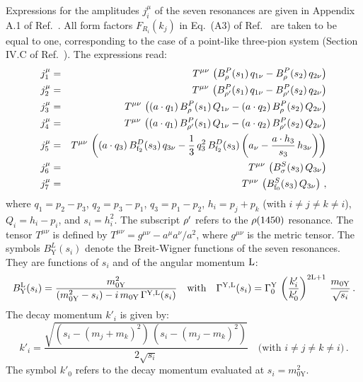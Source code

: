 Expressions for the amplitudes $j_{i}^{\mu}$ of the seven resonances are given in Appendix A.1 of Ref.~\cite{CLEO:1999rzk}.
All form factors $F_{R_{i}}(k_{j})$ in Eq.~(A3) of Ref.~\cite{CLEO:1999rzk} are taken to be equal to one,
corresponding to the case of a point-like three-pion system (\cf Section IV.C of Ref.~\cite{CLEO:1999rzk}).
The expressions read:
\begin{eqnarray}
j_{1}^{\mu} & = & T^{\mu\nu} \, \left( B_{\rho}^{P}(s_{1}) \, q_{1\nu} - B_{\rho}^{P}(s_{2}) \, q_{2\nu} \right) \nonumber \\
j_{2}^{\mu} & = & T^{\mu\nu} \, \left( B_{\rho'}^{P}(s_{1}) \, q_{1\nu} - B_{\rho'}^{P}(s_{2}) \, q_{2\nu} \right) \nonumber \\
j_{3}^{\mu} & = & T^{\mu\nu} \, \left( (a \cdot q_{1}) \, B_{\rho}^{P}(s_{1}) \, Q_{1\nu} - (a \cdot q_{2}) \, B_{\rho}^{P}(s_{2}) \, Q_{2\nu} \right) \nonumber \\
j_{4}^{\mu} & = & T^{\mu\nu} \, \left( (a \cdot q_{1}) \, B_{\rho'}^{P}(s_{1}) \, Q_{1\nu} - (a \cdot q_{2}) \, B_{\rho'}^{P}(s_{2}) \, Q_{2\nu} \right) \nonumber \\
j_{5}^{\mu} & = & T^{\mu\nu} \, \left( (a \cdot q_{3}) \, B_{\textrm{f}_{2}}^{D}(s_{3}) \, q_{3\nu} - \frac{1}{3} \, q_{3}^{2} \, B_{\textrm{f}_{2}}^{D}(s_{3}) \left( a_{\nu} - \frac{a \cdot h_{3}}{s_{3}} \, h_{3\nu} \right) \right) \nonumber \\
j_{6}^{\mu} & = & T^{\mu\nu} \, \left( B_{\sigma}^{S}(s_{3}) \, Q_{3\nu} \right) \nonumber \\
j_{7}^{\mu} & = & T^{\mu\nu} \, \left( B_{\textrm{f}_{0}}^{S}(s_{3}) \, Q_{3\nu} \right) \, ,
\end{eqnarray}
where 
$q_{1} = p_{2} - p_{3}$, $q_{2} = p_{3} - p_{1}$, $q_{3} = p_{1} - p_{2}$,
$h_{i} = p_{j} + p_{k}$ (with $i \not= j \not= k \not= i$),
$Q_{i} = h_{i} - p_{i}$, and $s_{i} = h_{i}^{2}$. 
The subscript $\rho'$ refers to the $\rho\textrm{(1450)}$ resonance.
The tensor $T^{\mu\nu}$ is defined by $T^{\mu\nu} = g^{\mu\nu} - a^{\mu}a^{\nu}/a^{2}$, where $g^{\mu\nu}$ is the metric tensor.
The symbols $B_{\textrm{Y}}^{L}(s_{i})$ denote the Breit-Wigner functions of the seven resonances.
They are functions of $s_{i}$ and of the angular momentum $\textrm{L}$:
\begin{equation}
B_{\textrm{Y}}^{\textrm{L}}(s_{i}) = \frac{m_{0\textrm{Y}}^{2}}{(m_{0\textrm{Y}}^{2} - s_{i}) - i \, m_{0\textrm{Y}} \, \Gamma^{\textrm{Y},\textrm{L}}(s_{i})}
 \quad \mbox{with} \quad
\Gamma^{\textrm{Y},\textrm{L}}(s_{i}) = \Gamma_{0}^{\textrm{Y}} \, \left(\frac{k'_{i}}{k'_{0}}\right)^{2\textrm{L}+1} \, \frac{m_{0\textrm{Y}}}{\sqrt{s_{i}}} \, .
\label{eq:BY}
\end{equation}
The decay momentum $k'_{i}$ is given by:
\begin{equation}
k'_{i} = \frac{\sqrt{\left( s_{i} - (m_{j} + m_{k})^{2} \right) \, \left( s_{i} - (m_{j} - m_{k})^{2} \right)}}{2\sqrt{s_{i}}} 
  \quad \mbox{(with $i \not= j \not= k \not= i$)} \, .
\label{eq:k}
\end{equation}
The symbol $k'_{0}$ refers to the decay momentum evaluated at $s_{i} = m_{0\textrm{Y}}^{2}$.

